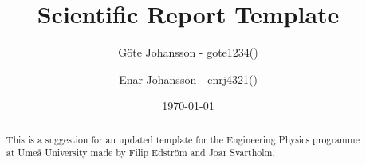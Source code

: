 

\usepackage{lipsum}

  \title{Scientific Report Template}
  \author{
    Göte Johansson - gote1234() \and
    Enar Johansson - enrj4321()
  }
  \date{\today}







\begin{titlepage}

  \maketitle
  \thispagestyle{FirstPageStyle}

  \begin{abstract}
   \noindent
   This is a suggestion for an updated template for the Engineering Physics programme at Umeå University made by Filip Edström and Joar Svartholm.
  \end{abstract}

\end{titlepage}


\pagestyle{DocumentStyle}
\tableofcontents
\newpage

